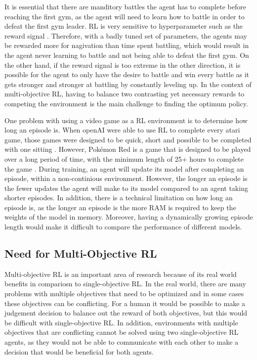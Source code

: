 It is essential that there are manditory battles the agent has to complete before reaching the first gym, as the agent will need to learn how to battle in order to defeat the first gym leader. RL is very sensitive to hyperparameter such as the reward signal \cite{XanderSteenbrugge2019ppo}. Therefore, with a badly tuned set of parameters, the agents may be rewarded more for nagivation than time spent battling, which would result in the agent never learning to battle and not being able to defeat the first gym. On the other hand, if the reward signal is too extreme in the other direction, it is possible for the agent to only have the desire to battle and win every battle as it gets stronger and stronger at battling by constantly leveling up. In the context of multi-objective RL, having to balance two contrasting yet necessary rewards to competing the environment is the main challenge to finding the optimum policy. 

One problem with using a video game as a RL environment is to determine how long an episode is. When openAI were able to use RL to complete every atari game, those games were designed to be quick, short and possible to be completed with one sitting \cite{brockman2016openai}. However, Pokémon Red is a game that is designed to be played over a long period of time, with the minimum length of 25+ hours to complete the game \cite{howlongtobeat}. During training, an agent will update its model after completing an episode, within a non-continious environment. However, the longer an episode is the fewer updates the agent will make to its model compared to an agent taking shorter episodes. In addition, there is a technical limitation on how long an episode is, as the longer an episode is the more RAM is required to keep the weights of the model in memory. Moreover, having a dynamically growing episode length would make it difficult to compare the performance of different models.


\subsection{Need for Multi-Objective RL} 

Multi-objective RL is an important area of research because of its real world benefits in compariosn to single-objective RL. In the real world, there are many problems with multiple objectives that need to be optimized and in some cases these objectives can be conflicting. For a human it would be possible to make a judgement decision to balance out the reward of both objectives, but this would be difficult with single-objective RL. In addition, environments with multiple objectives that are conflicting cannot be solved using two single-objective RL agents, as they would not be able to communicate with each other to make a decision that would be beneficial for both agents. %

